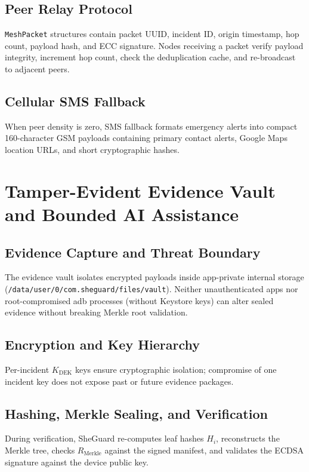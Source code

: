 \documentclass[conference]{IEEEtran}
\begin{document}
\subsection{Peer Relay Protocol}
\texttt{MeshPacket} structures contain packet UUID, incident ID, origin timestamp, hop count, payload hash, and ECC signature. Nodes receiving a packet verify payload integrity, increment hop count, check the deduplication cache, and re-broadcast to adjacent peers.

\subsection{Cellular SMS Fallback}
When peer density is zero, SMS fallback formats emergency alerts into compact 160-character GSM payloads containing primary contact alerts, Google Maps location URLs, and short cryptographic hashes.

\section{Tamper-Evident Evidence Vault and Bounded AI Assistance}

\subsection{Evidence Capture and Threat Boundary}
The evidence vault isolates encrypted payloads inside app-private internal storage (\texttt{/data/user/0/com.sheguard/files/vault}). Neither unauthenticated apps nor root-compromised adb processes (without Keystore keys) can alter sealed evidence without breaking Merkle root validation.

\subsection{Encryption and Key Hierarchy}
Per-incident $K_{\mathrm{DEK}}$ keys ensure cryptographic isolation; compromise of one incident key does not expose past or future evidence packages.

\subsection{Hashing, Merkle Sealing, and Verification}
During verification, SheGuard re-computes leaf hashes $H_i$, reconstructs the Merkle tree, checks $R_{\mathrm{Merkle}}$ against the signed manifest, and validates the ECDSA signature against the device public key.
\end{document}
